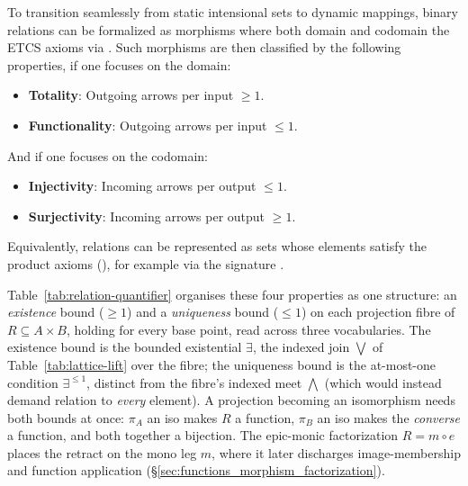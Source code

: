 \documentclass[11pt, a4paper]{article}
\begin{document}
To transition seamlessly from static intensional sets to dynamic mappings, binary relations can be formalized as morphisms  where both domain and codomain  the ETCS axioms via .
Such morphisms are then classified by the following properties, if one focuses on the domain:
\begin{itemize}
    \item \textbf{Totality}: Outgoing arrows per input $\ge 1$.
    \item \textbf{Functionality}: Outgoing arrows per input $\le 1$.
    \end{itemize}
 And if one focuses on the codomain:
 \begin{itemize}
    \item \textbf{Injectivity}: Incoming arrows per output $\le 1$.
    \item \textbf{Surjectivity}: Incoming arrows per output $\ge 1$.
\end{itemize}
Equivalently, relations can be represented as sets whose elements satisfy the product axioms (), for example via the signature .

Table~\ref{tab:relation-quantifier} organises these four properties as one structure: an \emph{existence} bound ($\ge 1$) and a \emph{uniqueness} bound ($\le 1$) on each projection fibre of $R \subseteq A \times B$, holding for every base point, read across three vocabularies.
The existence bound is the bounded existential $\exists$, the indexed join $\bigvee$ of Table~\ref{tab:lattice-lift} over the fibre; the uniqueness bound is the at-most-one condition $\exists^{\le 1}$, distinct from the fibre's indexed meet $\bigwedge$ (which would instead demand relation to \emph{every} element).
A projection becoming an isomorphism needs both bounds at once: $\pi_A$ an iso makes $R$ a function, $\pi_B$ an iso makes the \emph{converse} a function, and both together a bijection.
The epic-monic factorization $R = m \circ e$ places the retract on the mono leg $m$, where it later discharges image-membership and function application (§\ref{sec:functions_morphism_factorization}).
\end{document}
